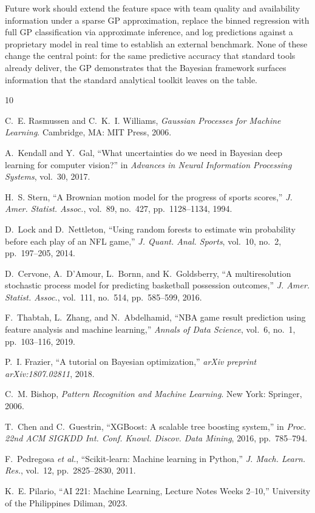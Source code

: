 \documentclass[conference]{IEEEtran}
\begin{document}
Future work should extend the feature space with team quality and availability information under a sparse GP approximation, replace the binned regression with full GP classification via approximate inference, and log predictions against a proprietary model in real time to establish an external benchmark. None of these change the central point: for the same predictive accuracy that standard tools already deliver, the GP demonstrates that the Bayesian framework surfaces information that the standard analytical toolkit leaves on the table.

\begin{thebibliography}{10}

C.~E. Rasmussen and C.~K.~I. Williams, \textit{Gaussian Processes for Machine Learning}. Cambridge, MA: MIT Press, 2006.

A.~Kendall and Y.~Gal, ``What uncertainties do we need in Bayesian deep learning for computer vision?'' in \textit{Advances in Neural Information Processing Systems}, vol.~30, 2017.

H.~S. Stern, ``A Brownian motion model for the progress of sports scores,'' \textit{J. Amer. Statist. Assoc.}, vol.~89, no.~427, pp.~1128--1134, 1994.

D.~Lock and D.~Nettleton, ``Using random forests to estimate win probability before each play of an NFL game,'' \textit{J. Quant. Anal. Sports}, vol.~10, no.~2, pp.~197--205, 2014.

D.~Cervone, A.~D'Amour, L.~Bornn, and K.~Goldsberry, ``A multiresolution stochastic process model for predicting basketball possession outcomes,'' \textit{J. Amer. Statist. Assoc.}, vol.~111, no.~514, pp.~585--599, 2016.

F.~Thabtah, L.~Zhang, and N.~Abdelhamid, ``NBA game result prediction using feature analysis and machine learning,'' \textit{Annals of Data Science}, vol.~6, no.~1, pp.~103--116, 2019.

P.~I. Frazier, ``A tutorial on Bayesian optimization,'' \textit{arXiv preprint arXiv:1807.02811}, 2018.

C.~M. Bishop, \textit{Pattern Recognition and Machine Learning}. New York: Springer, 2006.

T.~Chen and C.~Guestrin, ``XGBoost: A scalable tree boosting system,'' in \textit{Proc. 22nd ACM SIGKDD Int. Conf. Knowl. Discov. Data Mining}, 2016, pp.~785--794.

F.~Pedregosa \textit{et al.}, ``Scikit-learn: Machine learning in Python,'' \textit{J. Mach. Learn. Res.}, vol.~12, pp.~2825--2830, 2011.

K.~E. Pilario, ``AI 221: Machine Learning, Lecture Notes Weeks 2--10,'' University of the Philippines Diliman, 2023.

\end{thebibliography}
\end{document}
